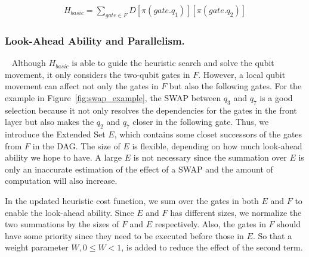 \documentclass[journal,10pt,twocolumn]{IEEEtran}
\begin{document}
\begin{equation}\label{eq:basic}
\begin{aligned}
H_{basic} = \sum_{gate \in F}D[\pi(gate.q_1)][\pi(gate.q_2)] 
\end{aligned}
\end{equation}

\subsubsection{Look-Ahead Ability and Parallelism.}~\label{sec:optimizeH}
Although $H_{basic}$ is able to guide the heuristic search and solve the qubit movement, it only considers the two-qubit gates in $F$. 
However, a local qubit movement can affect not only the gates in $F$ but also the following gates. For the example in Figure~\ref{fig:swap_example}, the SWAP between $q_3$ and $q_7$ is a good selection because it not only resolves the dependencies for the gates in the front layer but also makes the $q_2$ and $q_7$ closer in the following gate.
Thus, we introduce the Extended Set $E$, which contains some closet successors of the gates from $F$ in the DAG.
The size of $E$ is flexible, depending on how much look-ahead ability we hope to have.
A large $E$ is not necessary since the summation over $E$ is only an inaccurate estimation of the effect of a SWAP and the amount of computation will also increase.

In the updated heuristic cost function, we sum over the gates in both $E$ and $F$ to enable the look-ahead ability.
Since $E$ and $F$ has different sizes, we normalize the two summations by the sizes of $F$ and $E$ respectively.
Also, the gates in $F$ should have some priority since they need to be executed before those in $E$. 
So that a weight parameter $W,  0 \leq W < 1$, is added to reduce the effect of the second term.
\end{document}
